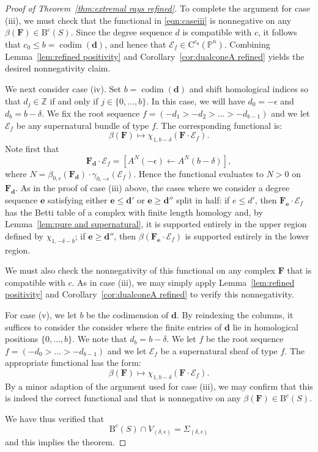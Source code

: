 \documentclass[12pt]{amsart}
\theoremstyle{definition}
\theoremstyle{remark}
\newcommand{\codim}{\operatorname{codim}}
\newcommand{\PP}{\mathbb{P}}
\newcommand{\ZZ}{\mathbb{Z}}
\newcommand{\cc}{c}
\newcommand{\dd}{\mathbf{d}}
\newcommand{\ee}{\mathbf{e}}
\newcommand{\cE}{\mathcal{E}}
\newcommand{\FF}{\mathbf{F}}
\newcommand{\CQ}{\mathrm{C}}
\newcommand{\BBQ}{\mathrm{B}}
\begin{document}
\begin{proof}[Proof of Theorem~\ref{thm:extremal rays refined}]
To complete the argument for case (iii), we must check that the functional in \eqref{eqn:caseiii}  is nonnegative on any $\beta(\FF)\in \BBQ^{\cc}(S)$.  Since the degree sequence $d$ is compatible with $\cc$, it follows that $c_0\leq b=\codim(\dd)$, and hence that $\cE_f\in \CQ^{c_0}(\PP^n)$.  Combining Lemma~\ref{lem:refined positivity} and Corollary~\ref{cor:dualconeA refined} yields the desired nonnegativity claim.

We next consider case (iv).  Set $b=\codim(\dd)$ and shift homological indices so that $d_j\in \ZZ$ if and only if $j\in \{0, \dots, b\}$.  In this case, we will have $d_0=-\epsilon$ and $d_b=b-\delta$.  We fix the root sequence $f=(-d_{1}>-d_{2}>\dots>-d_{b-1})$ and we let $\cE_f$ be any supernatural bundle of type $f$.   The corresponding functional is:
\[
\beta(\FF)\mapsto \chi_{1,b-\delta}(\FF\cdot \cE_f).
\]
Note first that
\[
\FF_{\dd}\cdot \cE_f=\left[{A^N}(-\epsilon)\gets A^N(b-\delta) \right],
\]
where $N=\beta_{0,\epsilon}(\FF_{\dd})\cdot \gamma_{0,-\epsilon}(\cE_f)$.  Hence the functional evaluates to $N>0$ on $\FF_{\dd}$.  
As in the proof of case (iii) above, the cases where we consider a degree sequence $\ee$ satisfying either $\ee\leq \dd'$  or $\ee\geq \dd''$ split in half:
if $e\leq d'$, then $\FF_{\ee}\cdot \cE_f$ has the Betti table of a complex with finite length homology and, by Lemma~\ref{lem:pure and supernatural}, it is supported entirely in the upper region defined by $\chi_{1,-\delta-b}$; if $\ee\geq \dd''$, then $\beta(\FF_{\ee}\cdot \cE_f)$ is supported entirely in the lower region.  

We must also check the nonnegativity of this functional on any complex $\FF$ that is compatible with $\cc$.   As in case (iii), we may simply apply Lemma~\ref{lem:refined positivity} and Corollary~\ref{cor:dualconeA refined} to verify this nonnegativity.

For case (v), we let $b$ be the codimension of $\dd$.  By reindexing the columns, it suffices to consider the consider where the finite entries of $\dd$ lie in homological positions $\{0,\dots,b\}$.  We note that $d_{b}=b-\delta$.  We let $f$ be the root sequence $f=(-d_0>\dots >-d_{b-1})$ and we let $\cE_f$ be a supernatural sheaf of type $f$.  The appropriate functional has the form:
\[
\beta(\FF)\mapsto \chi_{1,b-\delta}(\FF\cdot \cE_f).
\]
By a minor adaption of the argument used for case (iii), we may confirm that this is indeed the correct functional and that is nonnegative on any $\beta(\FF)\in \BBQ^{\cc}(S)$.

We have thus verified that
\[
\BBQ^{\cc}(S)\cap V_{(\delta,\epsilon)}=\Sigma_{(\delta,\epsilon)}
\]
and this implies the theorem.
\end{proof}
\end{document}
